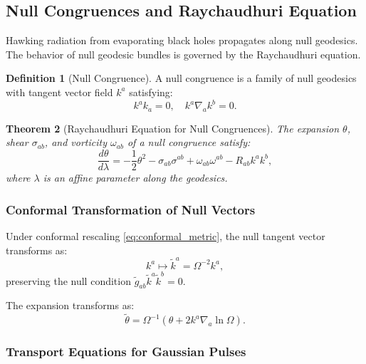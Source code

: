 \documentclass[11pt,a4paper]{article}
\newcommand{\conf}{\Omega}
\newcommand{\Ricciab}{R_{ab}}
\theoremstyle{plain}
\newtheorem{theorem}{Theorem}[section]
\theoremstyle{definition}
\newtheorem{definition}[theorem]{Definition}
\theoremstyle{remark}
\begin{document}
\subsection{Null Congruences and Raychaudhuri Equation}\label{subsec:null_congruences}

Hawking radiation from evaporating black holes propagates along null geodesics. The behavior of null geodesic bundles is governed by the Raychaudhuri equation.

\begin{definition}[Null Congruence]
A null congruence is a family of null geodesics with tangent vector field $k^a$ satisfying:
\begin{equation}
    k^a k_a = 0, \quad k^a \nabla_a k^b = 0.
\end{equation}
\end{definition}

\begin{theorem}[Raychaudhuri Equation for Null Congruences]
The expansion $\theta$, shear $\sigma_{ab}$, and vorticity $\omega_{ab}$ of a null congruence satisfy:
\begin{equation}\label{eq:raychaudhuri}
    \frac{d\theta}{d\lambda} = -\frac{1}{2}\theta^2 - \sigma_{ab}\sigma^{ab} + \omega_{ab}\omega^{ab} - \Ricciab k^a k^b,
\end{equation}
where $\lambda$ is an affine parameter along the geodesics.
\end{theorem}

\subsubsection{Conformal Transformation of Null Vectors}

Under conformal rescaling \eqref{eq:conformal_metric}, the null tangent vector transforms as:
\begin{equation}\label{eq:k_transformation}
    k^a \mapsto \tilde{k}^a = \conf^{-2} k^a,
\end{equation}
preserving the null condition $\tilde{g}_{ab}\tilde{k}^a\tilde{k}^b = 0$.

The expansion transforms as:
\begin{equation}
    \tilde{\theta} = \conf^{-1}\left(\theta + 2k^a\nabla_a\ln\conf\right).
\end{equation}

\subsubsection{Transport Equations for Gaussian Pulses}
\end{document}
